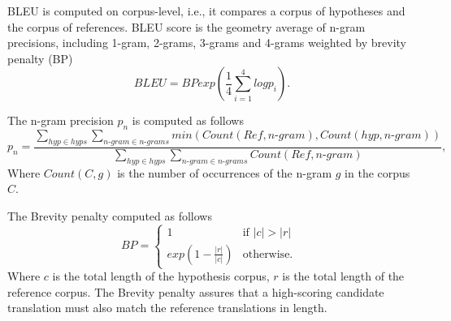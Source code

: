 BLEU is computed on corpus-level, i.e., it compares a corpus of hypotheses and the corpus of references. BLEU score is the geometry average of n-gram precisions, including 1-gram, 2-grams, 3-grams and 4-grams weighted by brevity penalty (BP)
\begin{equation}
BLEU = BP exp(\frac{1}{4}\sum_{i=1}^4log p_i).
\end{equation}

The n-gram precision $p_n$ is computed as follows
\begin{equation}
p_n = \frac{\sum_{hyp \in hyps}\sum_{n\text{-}gram \in n\text{-}grams} min(Count(Ref,n\text{-}gram), Count(hyp, n\text{-}gram))}{\sum_{hyp \in hyps}\sum_{n\text{-}gram \in n\text{-}grams} Count(Ref,n\text{-}gram)},
\end{equation}
Where $Count(C,g)$ is the number of occurrences of the n-gram $g$ in the corpus $C$.

The Brevity penalty computed as follows
\begin{equation}
  BP =
    \begin{cases}
      1 & \text{if $|c| > |r|$ }\\
      exp(1-\frac{|r|}{|c|}) & \text{otherwise}.
    \end{cases}       
\end{equation}
Where $c$ is the total length of the hypothesis corpus, $r$ is the total length of the reference corpus. The Brevity penalty assures that a high-scoring candidate translation must also match the reference translations in length.







































